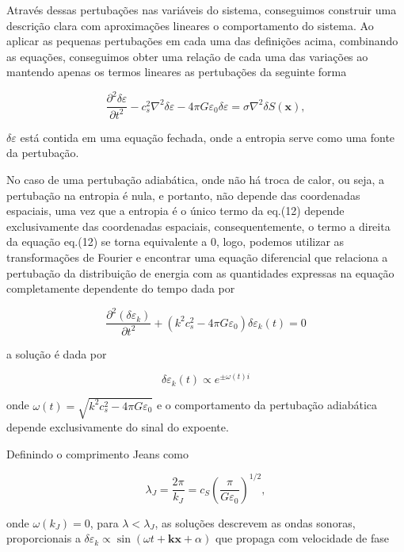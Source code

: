 Através dessas pertubações nas variáveis do sistema, conseguimos construir uma descrição clara com aproximações lineares o comportamento do sistema. Ao aplicar as pequenas pertubações em cada uma das definições acima, combinando as equações, conseguimos obter uma relação de cada uma das variações ao mantendo apenas os termos lineares as pertubações da seguinte forma 

\begin{equation}\label{eq12}
	\dfrac{\partial^2\delta\varepsilon}{\partial t^2} - c^2_s\nabla^2\delta\varepsilon - 4\pi G\varepsilon_0\delta\varepsilon = \sigma\nabla^2\delta S(\textbf{x}),
\end{equation}

$ \delta\varepsilon $ está contida em uma equação fechada, onde a entropia serve como uma fonte da pertubação.

No caso de uma pertubação adiabática, onde não há troca de calor, ou seja, a pertubação na entropia é nula, e portanto, não depende das coordenadas espaciais, uma vez que a entropia é o único termo da eq.(12) depende exclusivamente das coordenadas espaciais, consequentemente, o termo a direita da equação eq.(12) se torna equivalente a 0, logo, podemos utilizar as transformações de Fourier e encontrar uma equação diferencial que relaciona a pertubação da distribuição de energia com as quantidades expressas na equação completamente dependente do tempo dada por 

\begin{equation}\label{eq13}
	\dfrac{\partial^2 (\delta\varepsilon_k )}{\partial t^2} +(k^2c^2_s - 4\pi G\varepsilon_0)\delta\varepsilon_k (t) = 0
\end{equation}

a solução é dada por 

\begin{equation}\label{eq14}
	\delta\varepsilon_k (t) \propto e^{\pm \omega (t) i}
\end{equation}

onde $\omega (t) = \sqrt{k^2c^2_s - 4\pi G \varepsilon_0}$ e o comportamento da pertubação adiabática depende exclusivamente do sinal do expoente.

Definindo o comprimento Jeans como

\begin{equation}\label{eq15}
	\lambda_J = \dfrac{2\pi}{k_J} = c_S \left(\dfrac{\pi}{G\varepsilon_0} \right)^{1/2},
\end{equation}

onde $\omega (k_J) = 0$, para  $\lambda < \lambda_J$, as soluções descrevem as ondas sonoras, proporcionais a $ \delta\varepsilon_k \propto \sin (\omega t + \mathbf{k}\mathbf{x} + \alpha) $ que propaga com velocidade de fase 

